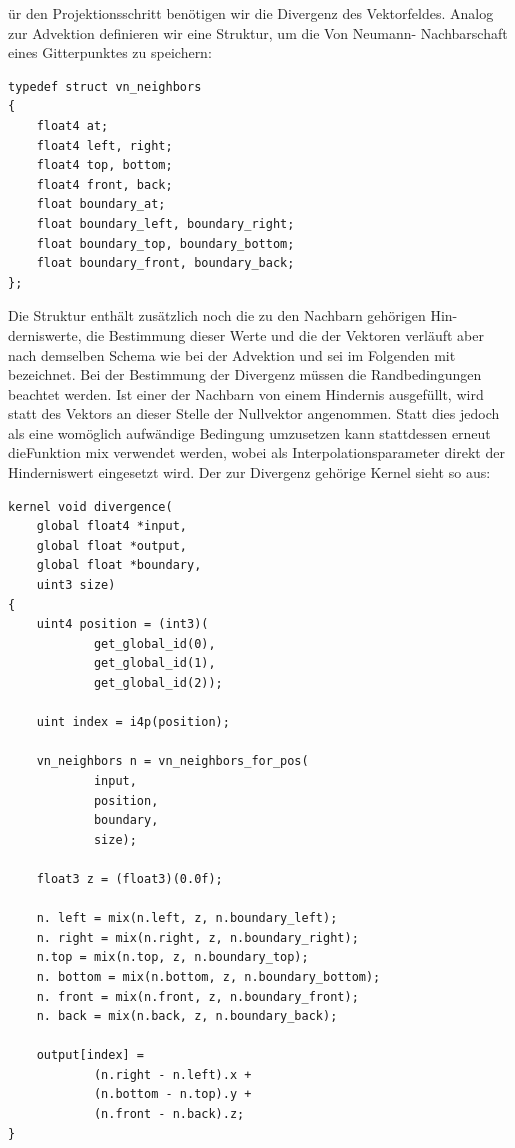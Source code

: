 ür den Projektionsschritt benötigen wir die Divergenz des Vektorfeldes.
Analog zur Advektion definieren wir eine Struktur, um die Von Neumann-
Nachbarschaft eines Gitterpunktes zu speichern:

\begin{lstlisting}
typedef struct vn_neighbors
{
    float4 at;
    float4 left, right;
    float4 top, bottom;
    float4 front, back;
    float boundary_at;
    float boundary_left, boundary_right;
    float boundary_top, boundary_bottom;
    float boundary_front, boundary_back;
};
\end{lstlisting}

Die Struktur enthält zusätzlich noch die zu den Nachbarn gehörigen Hin-
derniswerte, die Bestimmung dieser Werte und die der Vektoren verläuft aber
nach demselben Schema wie bei der Advektion und sei im Folgenden mit
 bezeichnet.
Bei der Bestimmung der Divergenz müssen die Randbedingungen beachtet werden. Ist
einer der Nachbarn von einem Hindernis ausgefüllt, wird statt des Vektors an
dieser Stelle der Nullvektor angenommen. Statt dies jedoch als eine womöglich
aufwändige Bedingung umzusetzen kann stattdessen erneut dieFunktion mix
verwendet werden, wobei als Interpolationsparameter direkt der Hinderniswert
eingesetzt wird. Der zur Divergenz gehörige Kernel sieht so aus:

\begin{lstlisting}
kernel void divergence(
    global float4 *input,
    global float *output,
    global float *boundary,
    uint3 size)
{
    uint4 position = (int3)(
            get_global_id(0),
            get_global_id(1),
            get_global_id(2));

    uint index = i4p(position);

    vn_neighbors n = vn_neighbors_for_pos(
            input,
            position,
            boundary,
            size);

    float3 z = (float3)(0.0f);

    n. left = mix(n.left, z, n.boundary_left);
    n. right = mix(n.right, z, n.boundary_right);
    n.top = mix(n.top, z, n.boundary_top);
    n. bottom = mix(n.bottom, z, n.boundary_bottom);
    n. front = mix(n.front, z, n.boundary_front);
    n. back = mix(n.back, z, n.boundary_back);

    output[index] =
            (n.right - n.left).x +
            (n.bottom - n.top).y +
            (n.front - n.back).z;
}
\end{lstlisting}

